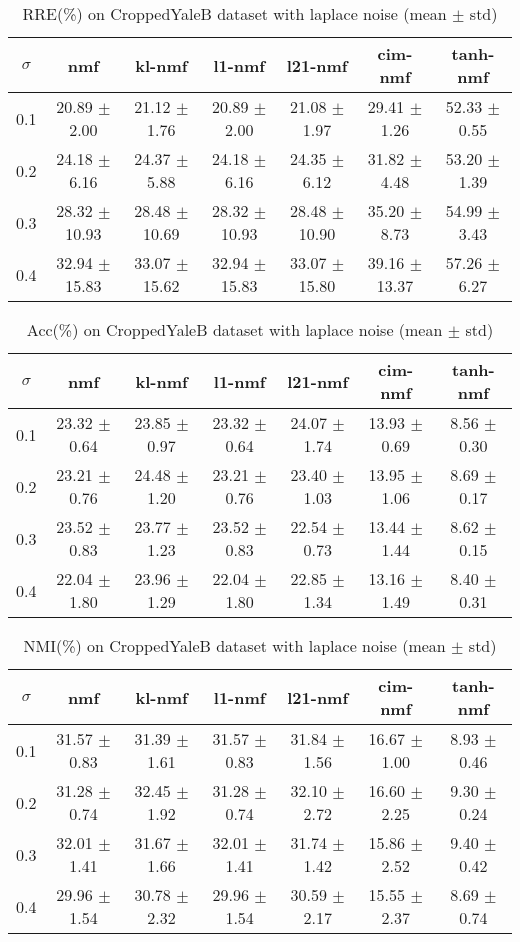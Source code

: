\documentclass{article} %
\begin{document}
\begin{table}
\begin{tabular}{c|cccccc}$\sigma$ & nmf & kl-nmf & l1-nmf & l21-nmf & cim-nmf & tanh-nmf \\\hline
0.1 & 20.89 $\pm$ 2.00 & 21.12 $\pm$ 1.76 & 20.89 $\pm$ 2.00 & 21.08 $\pm$ 1.97 & 29.41 $\pm$ 1.26 & 52.33 $\pm$ 0.55 \\
0.2 & 24.18 $\pm$ 6.16 & 24.37 $\pm$ 5.88 & 24.18 $\pm$ 6.16 & 24.35 $\pm$ 6.12 & 31.82 $\pm$ 4.48 & 53.20 $\pm$ 1.39 \\
0.3 & 28.32 $\pm$ 10.93 & 28.48 $\pm$ 10.69 & 28.32 $\pm$ 10.93 & 28.48 $\pm$ 10.90 & 35.20 $\pm$ 8.73 & 54.99 $\pm$ 3.43 \\
0.4 & 32.94 $\pm$ 15.83 & 33.07 $\pm$ 15.62 & 32.94 $\pm$ 15.83 & 33.07 $\pm$ 15.80 & 39.16 $\pm$ 13.37 & 57.26 $\pm$ 6.27 \\
\end{tabular}\caption{
  RRE(\%) on CroppedYaleB dataset with laplace noise (mean $\pm$ std)
  \label{tab:RRE-CroppedYaleB-laplace}
}\end{table}
\begin{table}
\begin{tabular}{c|cccccc}$\sigma$ & nmf & kl-nmf & l1-nmf & l21-nmf & cim-nmf & tanh-nmf \\\hline
0.1 & 23.32 $\pm$ 0.64 & 23.85 $\pm$ 0.97 & 23.32 $\pm$ 0.64 & 24.07 $\pm$ 1.74 & 13.93 $\pm$ 0.69 & 8.56 $\pm$ 0.30 \\
0.2 & 23.21 $\pm$ 0.76 & 24.48 $\pm$ 1.20 & 23.21 $\pm$ 0.76 & 23.40 $\pm$ 1.03 & 13.95 $\pm$ 1.06 & 8.69 $\pm$ 0.17 \\
0.3 & 23.52 $\pm$ 0.83 & 23.77 $\pm$ 1.23 & 23.52 $\pm$ 0.83 & 22.54 $\pm$ 0.73 & 13.44 $\pm$ 1.44 & 8.62 $\pm$ 0.15 \\
0.4 & 22.04 $\pm$ 1.80 & 23.96 $\pm$ 1.29 & 22.04 $\pm$ 1.80 & 22.85 $\pm$ 1.34 & 13.16 $\pm$ 1.49 & 8.40 $\pm$ 0.31 \\
\end{tabular}\caption{
  Acc(\%) on CroppedYaleB dataset with laplace noise (mean $\pm$ std)
  \label{tab:Acc-CroppedYaleB-laplace}
}\end{table}
\begin{table}
\begin{tabular}{c|cccccc}$\sigma$ & nmf & kl-nmf & l1-nmf & l21-nmf & cim-nmf & tanh-nmf \\\hline
0.1 & 31.57 $\pm$ 0.83 & 31.39 $\pm$ 1.61 & 31.57 $\pm$ 0.83 & 31.84 $\pm$ 1.56 & 16.67 $\pm$ 1.00 & 8.93 $\pm$ 0.46 \\
0.2 & 31.28 $\pm$ 0.74 & 32.45 $\pm$ 1.92 & 31.28 $\pm$ 0.74 & 32.10 $\pm$ 2.72 & 16.60 $\pm$ 2.25 & 9.30 $\pm$ 0.24 \\
0.3 & 32.01 $\pm$ 1.41 & 31.67 $\pm$ 1.66 & 32.01 $\pm$ 1.41 & 31.74 $\pm$ 1.42 & 15.86 $\pm$ 2.52 & 9.40 $\pm$ 0.42 \\
0.4 & 29.96 $\pm$ 1.54 & 30.78 $\pm$ 2.32 & 29.96 $\pm$ 1.54 & 30.59 $\pm$ 2.17 & 15.55 $\pm$ 2.37 & 8.69 $\pm$ 0.74 \\
\end{tabular}\caption{
  NMI(\%) on CroppedYaleB dataset with laplace noise (mean $\pm$ std)
  \label{tab:NMI-CroppedYaleB-laplace}
}\end{table}
\end{document}
